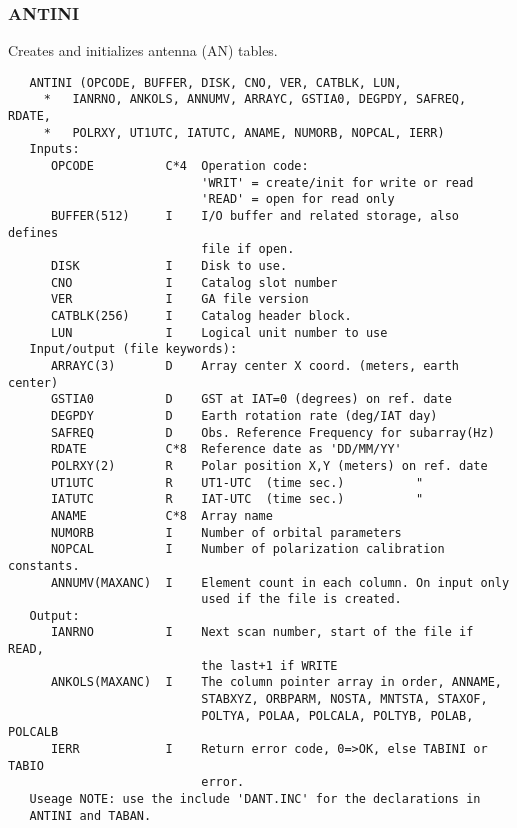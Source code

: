 \subsubsection{ANTINI}
Creates and initializes antenna (AN) tables.
\begin{verbatim}
   ANTINI (OPCODE, BUFFER, DISK, CNO, VER, CATBLK, LUN,
     *   IANRNO, ANKOLS, ANNUMV, ARRAYC, GSTIA0, DEGPDY, SAFREQ, RDATE,
     *   POLRXY, UT1UTC, IATUTC, ANAME, NUMORB, NOPCAL, IERR)
   Inputs:
      OPCODE          C*4  Operation code:
                           'WRIT' = create/init for write or read
                           'READ' = open for read only
      BUFFER(512)     I    I/O buffer and related storage, also defines
                           file if open.
      DISK            I    Disk to use.
      CNO             I    Catalog slot number
      VER             I    GA file version
      CATBLK(256)     I    Catalog header block.
      LUN             I    Logical unit number to use
   Input/output (file keywords):
      ARRAYC(3)       D    Array center X coord. (meters, earth center)
      GSTIA0          D    GST at IAT=0 (degrees) on ref. date
      DEGPDY          D    Earth rotation rate (deg/IAT day)
      SAFREQ          D    Obs. Reference Frequency for subarray(Hz)
      RDATE           C*8  Reference date as 'DD/MM/YY'
      POLRXY(2)       R    Polar position X,Y (meters) on ref. date
      UT1UTC          R    UT1-UTC  (time sec.)          "
      IATUTC          R    IAT-UTC  (time sec.)          "
      ANAME           C*8  Array name
      NUMORB          I    Number of orbital parameters
      NOPCAL          I    Number of polarization calibration constants.
      ANNUMV(MAXANC)  I    Element count in each column. On input only
                           used if the file is created.
   Output:
      IANRNO          I    Next scan number, start of the file if READ,
                           the last+1 if WRITE
      ANKOLS(MAXANC)  I    The column pointer array in order, ANNAME,
                           STABXYZ, ORBPARM, NOSTA, MNTSTA, STAXOF,
                           POLTYA, POLAA, POLCALA, POLTYB, POLAB, POLCALB
      IERR            I    Return error code, 0=>OK, else TABINI or TABIO
                           error.
   Useage NOTE: use the include 'DANT.INC' for the declarations in
   ANTINI and TABAN.
\end{verbatim}

